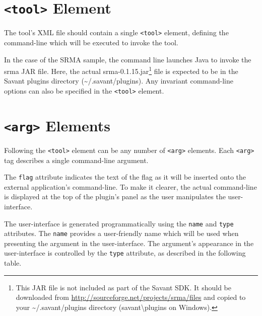 \documentclass[times,11pt]{report}
\begin{document}
\section{{\tt\textless tool\textgreater} Element}
The tool's XML file should contain a single {\tt\textless tool\textgreater} element, defining the command-line which will be executed to invoke the tool.

In the case of the SRMA sample, the command line launches Java to invoke the srma JAR file.  Here, the actual srma-0.1.15.jar\footnote{This JAR file is not included as part of the Savant SDK.  It should be downloaded from \href{http://sourceforge.net/projects/srma/files}{http://sourceforge.net/projects/srma/files} and copied to your \textasciitilde/.savant/plugins directory (savant\textbackslash plugins on Windows).} file is expected to be in the Savant plugins directory (\textasciitilde/.savant/plugins).  Any invariant command-line options can also be specified in the {\tt\textless tool\textgreater} element.

\section{{\tt\textless arg\textgreater} Elements}
Following the {\tt\textless tool\textgreater} element can be any number of {\tt\textless arg\textgreater} elements.  Each {\tt\textless arg\textgreater} tag describes a single command-line argument.

The {\tt flag} attribute indicates the text of the flag as it will be inserted onto the external application's command-line.  To make it clearer, the actual command-line is displayed at the top of the plugin's panel as the user manipulates the user-interface.

The user-interface is generated programmatically using the {\tt name} and {\tt type} attributes.  The {\tt name} provides a user-friendly name which will be used when presenting the argument in the user-interface.  The argument's appearance in the user-interface is controlled by the {\tt type} attribute, as described in the following table.
\end{document}
